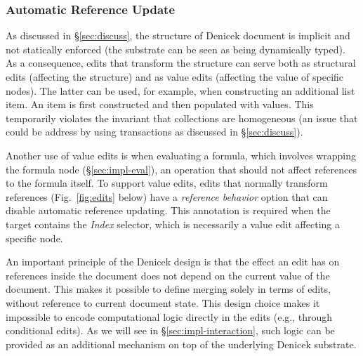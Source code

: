 \documentclass[sigconf,anonymous,screen]{acmart}
\newcommand{\ident}[1]{{\sffamily #1}}
\newcommand{\note}[1]{\textcolor{red}{#1}}
\begin{document}

\subsubsection*{Automatic Reference Update}
As discussed in \S\ref{sec:discuss}, the structure of Denicek document is implicit and not
statically enforced (the substrate can be seen as being dynamically typed). As a consequence, edits
that transform the structure can serve both as structural edits (affecting the structure)
and as value edits (affecting the value of specific nodes). The latter can be used, for example,
when constructing an additional list item. An item is first constructed and then populated
with values. This temporarily violates the invariant that collections are homogeneous
(an issue that could be address by using transactions as discussed in \S\ref{sec:discuss}).

Another use of value edits is when evaluating a formula, which involves wrapping the formula
node (\S\ref{sec:impl-eval}), an operation that should not affect references to the formula
itself. To support value edits, edits that normally transform references (Fig.~\ref{fig:edits} below)
have a \emph{reference behavior} option that can disable automatic reference
updating. This annotation is required when the target contains the \emph{Index} selector,
which is necessarily a value edit affecting a specific node.

%

An important principle of the Denicek design is that the effect an edit has on references inside
the document does not depend on the current value of the document. This makes it possible to
define merging solely in terms of edits, without reference to current document state.
This design choice makes it impossible to encode computational logic directly in the edits
(e.g., through conditional edits). As we will see in \S\ref{sec:impl-interaction}, such logic
can be provided as an additional mechanism on top of the underlying Denicek substrate.
\end{document}
